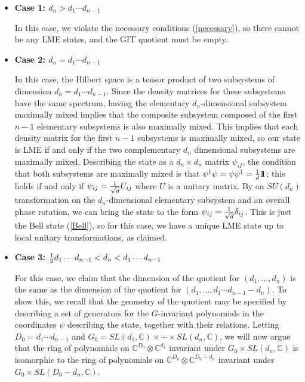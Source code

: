 \documentclass[12pt]{article}
\theoremstyle{definition}
\def\identity{{\rlap{1} \hskip 1.6pt \hbox{1}}}
\begin{document}
\begin{itemize}
\item
{\bf Case 1: $d_n > d_1 \cdots d_{n-1}$}

In this case, we violate the necessary conditions (\ref{necessary}), so there cannot be any LME states, and the GIT quotient must be empty.
\item
{\bf Case 2: $d_n = d_1 \cdots d_{n-1}$}

In this case, the Hilbert space is a tensor product of two subsystems of dimension $d_n = d_1 \cdots d_{n-1}$. Since the density matrices for these subsystems have the same spectrum, having the elementary $d_n$-dimensional subsystem maximally mixed implies that the composite subsystem composed of the first $n-1$ elementary subsystems is also maximally mixed. This implies that each density matrix for the first $n-1$ subsystems is maximally mixed, so our state is LME if and only if the two complementary $d_n$ dimensional subsystems are maximally mixed. Describing the state as a $d_n \times d_n$ matrix $\psi_{i I}$, the condition that both subsystems are maximally mixed is that $\psi^\dagger \psi = \psi \psi^\dagger = {1 \over d} \identity$; this holds if and only if $\psi_{i j} = {1 \over \sqrt{d}} U_{i j}$ where $U$ is a unitary matrix. By an $SU(d_n)$ transformation on the $d_n$-dimensional elementary subsystem and an overall phase rotation, we can bring the state to the form $\psi_{i j} = {1 \over \sqrt{d}} \delta_{i j}$. This is just the Bell state (\ref{Bell}), so for this case, we have a unique LME state up to local unitary transformations, as claimed.

\item
{\bf Case 3: ${1 \over 2} d_1 \cdots d_{n-1} < d_n <  d_1 \cdots d_{n-1}$}

For this case, we claim that the dimension of the quotient for $(d_1, \dots , d_n)$ is the same as the dimension of the quotient for $(d_1, \dots , d_1 \cdots d_{n-1} - d_n)$. To show this, we recall that the geometry of the quotient may be specified by describing a set of generators for the $G$-invariant polynomials in the coordinates $\psi$ describing the state, together with their relations. Letting $D_0 = d_1 \cdots d_{n-1}$ and $G_0 = SL(d_1, \mathbb{C}) \times \cdots \times SL(d_n, \mathbb{C})$, we will now argue that the ring of polynomials on $\mathbb{C}^{D_0} \otimes \mathbb{C}^{d_1}$ invariant under $G_0 \times SL(d_n, \mathbb{C})$ is isomorphic to the ring of polynomials on $\mathbb{C}^{D_0} \otimes \mathbb{C}^{{D_0} - d_n}$ invariant under $G_0 \times SL({D_0} - d_n, \mathbb{C})$.


\end{itemize}
\end{document}
